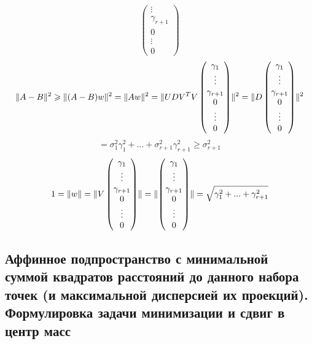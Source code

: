\documentclass[main.tex]{subfiles}
\begin{document}
\begin{Proof}
\[\begin{pmatrix}
            \vdots\\
            \gamma_{r + 1}\\
            0\\
            \vdots\\
            0
        \end{pmatrix}\]
        \[\lVert A - B \rVert^2 \geqslant \lVert (A - B)w \rVert^2 = \lVert Aw \rVert^2 = \lVert UDV^{T}V \begin{pmatrix}
            \gamma_1\\
            \vdots\\
            \gamma_{r + 1}\\
            0\\
            \vdots\\
            0
        \end{pmatrix} \rVert^2 = \lVert D \begin{pmatrix}
            \gamma_1\\
            \vdots\\
            \gamma_{r + 1}\\
            0\\
            \vdots\\
            0
        \end{pmatrix} \rVert^2\]
        \[= \sigma_1^2 \gamma_1^2 + ... + \sigma_{r + 1}^2 \gamma_{r + 1}^2 \geq
        \sigma_{r + 1}^2 \]
        \[1 = \lVert w \rVert = \lVert V \begin{pmatrix}
            \gamma_1\\
            \vdots\\
            \gamma_{r + 1}\\
            0\\
            \vdots\\
            0
        \end{pmatrix} \rVert = \lVert \begin{pmatrix}
            \gamma_1\\
            \vdots\\
            \gamma_{r + 1}\\
            0\\
            \vdots\\
            0
        \end{pmatrix} \rVert = \sqrt{\gamma_1^2 + ... + \gamma_{r + 1}^2} \]
    \end{Proof}

    \subsection{Аффинное подпространство с минимальной суммой квадратов расстояний до данного набора точек (и максимальной дисперсией их проекций). Формулировка задачи минимизации и сдвиг в центр масс}
\end{document}

